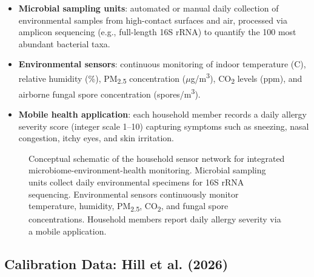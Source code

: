 \documentclass[11pt,letterpaper]{article}
\begin{document}
\begin{itemize}
    \item \textbf{Microbial sampling units}: automated or manual daily collection of environmental samples from high-contact surfaces and air, processed via amplicon sequencing (e.g., full-length 16S rRNA) to quantify the 100 most abundant bacterial taxa.
    \item \textbf{Environmental sensors}: continuous monitoring of indoor temperature (\textdegree C), relative humidity (\%), PM\textsubscript{2.5} concentration ($\mu$g/m\textsuperscript{3}), CO\textsubscript{2} levels (ppm), and airborne fungal spore concentration (spores/m\textsuperscript{3}).
    \item \textbf{Mobile health application}: each household member records a daily allergy severity score (integer scale 1--10) capturing symptoms such as sneezing, nasal congestion, itchy eyes, and skin irritation.
\end{itemize}

\begin{figure}[H]
    \centering
    \caption{Conceptual schematic of the household sensor network for integrated microbiome-environment-health monitoring. Microbial sampling units collect daily environmental specimens for 16S rRNA sequencing. Environmental sensors continuously monitor temperature, humidity, PM\textsubscript{2.5}, CO\textsubscript{2}, and fungal spore concentrations. Household members report daily allergy severity via a mobile application.}
    \label{fig:schematic}
\end{figure}

\subsection{Calibration Data: Hill et al. (2026)}
\end{document}
